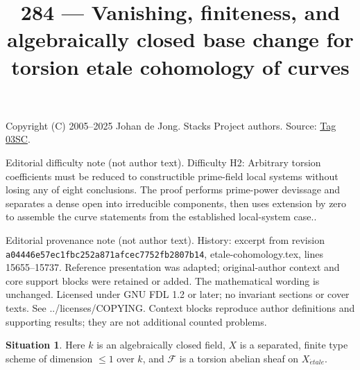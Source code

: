 \documentclass{amsart}
\theoremstyle{plain}
\theoremstyle{definition}
\newtheorem{situation}[subsection]{Situation}
\theoremstyle{remark}
\numberwithin{equation}{subsection}
\def\etale{{\acute{e}tale}}
\begin{document}
\title[Stacks Project, Tag 03SC]{284 --- Vanishing, finiteness, and algebraically closed base change for torsion etale cohomology of curves}
\maketitle
\noindent Copyright (C) 2005--2025 Johan de Jong. Stacks Project authors. Source: \href{https://stacks.math.columbia.edu/tag/03SC}{Tag 03SC}.

\noindent Editorial difficulty note (not author text). Difficulty H2: Arbitrary torsion coefficients must be reduced to constructible prime-field local systems without losing any of eight conclusions. The proof performs prime-power devissage and separates a dense open into irreducible components, then uses extension by zero to assemble the curve statements from the established local-system case..

\noindent Editorial provenance note (not author text). History: excerpt from revision \texttt{a0444\allowbreak 6e57e\allowbreak c1fbc\allowbreak 252a8\allowbreak 71afc\allowbreak ec775\allowbreak 2fb28\allowbreak 07b14}, etale-cohomology.tex, lines 15655--15737. Reference presentation was adapted; original-author context and core support blocks were retained or added. The mathematical wording is unchanged. Licensed under GNU FDL 1.2 or later; no invariant sections or cover texts. See ../licenses/COPYING. Context blocks reproduce author definitions and supporting results; they are not additional counted problems.

\begin{situation}
\label{situation-what-to-prove}
Here $k$ is an algebraically closed field, $X$ is a separated, finite type
scheme of dimension $\leq 1$ over $k$, and $\mathcal{F}$ is a torsion
abelian sheaf on $X_\etale$.
\end{situation}
\end{document}
